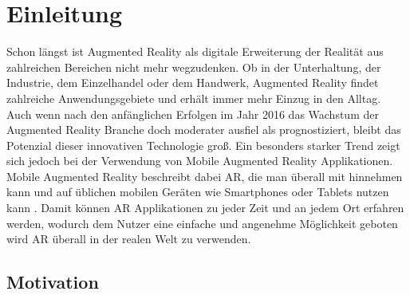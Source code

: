\documentclass[12pt,a4paper, oneside]{scrartcl}
\begin{document}
\tableofcontents



\newpage


\section{Einleitung}

Schon längst ist Augmented Reality als digitale Erweiterung der Realität aus zahlreichen Bereichen nicht mehr wegzudenken. Ob in der Unterhaltung, der Industrie, dem Einzelhandel oder dem Handwerk, Augmented Reality findet zahlreiche Anwendungsgebiete und erhält immer mehr Einzug in den Alltag.
Auch wenn nach den anfänglichen Erfolgen im Jahr 2016 das Wachstum der Augmented Reality Branche doch moderater ausfiel als prognostiziert, bleibt das Potenzial dieser innovativen Technologie groß.
Ein besonders starker Trend zeigt sich jedoch bei der Verwendung von Mobile Augmented Reality Applikationen. Mobile Augmented Reality beschreibt dabei AR, die man überall mit hinnehmen kann und auf üblichen mobilen Geräten wie Smartphones oder Tablets nutzen kann \cite{craig_2013}.
Damit können AR Applikationen zu jeder Zeit und an jedem Ort erfahren werden, wodurch dem Nutzer eine einfache und angenehme Möglichkeit geboten wird AR überall in der realen Welt zu verwenden.

	
	
\subsection{Motivation}
\end{document}
